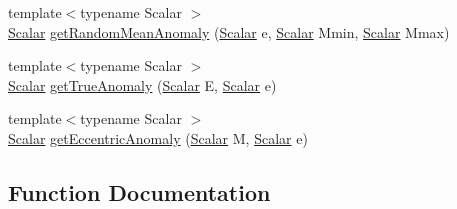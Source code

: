 \begin{DoxyCompactItemize}
\item 
{\footnotesize template$<$typename Scalar $>$ }\\\mbox{\hyperlink{create_kepler_8cpp_a8c2981f3f834be9448a6ab06c28748eb}{Scalar}} \mbox{\hyperlink{namespace_space_h_1_1_orbits_ab0a6bf4bbce5725fa15cc6250057817c}{get\+Random\+Mean\+Anomaly}} (\mbox{\hyperlink{create_kepler_8cpp_a8c2981f3f834be9448a6ab06c28748eb}{Scalar}} e, \mbox{\hyperlink{create_kepler_8cpp_a8c2981f3f834be9448a6ab06c28748eb}{Scalar}} Mmin, \mbox{\hyperlink{create_kepler_8cpp_a8c2981f3f834be9448a6ab06c28748eb}{Scalar}} Mmax)
\item 
{\footnotesize template$<$typename Scalar $>$ }\\\mbox{\hyperlink{create_kepler_8cpp_a8c2981f3f834be9448a6ab06c28748eb}{Scalar}} \mbox{\hyperlink{namespace_space_h_1_1_orbits_a43d1a07ed25eaf775f3a83d7000a2596}{get\+True\+Anomaly}} (\mbox{\hyperlink{create_kepler_8cpp_a8c2981f3f834be9448a6ab06c28748eb}{Scalar}} E, \mbox{\hyperlink{create_kepler_8cpp_a8c2981f3f834be9448a6ab06c28748eb}{Scalar}} e)
\item 
{\footnotesize template$<$typename Scalar $>$ }\\\mbox{\hyperlink{create_kepler_8cpp_a8c2981f3f834be9448a6ab06c28748eb}{Scalar}} \mbox{\hyperlink{namespace_space_h_1_1_orbits_a729783768420346b170d79aa5e196841}{get\+Eccentric\+Anomaly}} (\mbox{\hyperlink{create_kepler_8cpp_a8c2981f3f834be9448a6ab06c28748eb}{Scalar}} M, \mbox{\hyperlink{create_kepler_8cpp_a8c2981f3f834be9448a6ab06c28748eb}{Scalar}} e)
\end{DoxyCompactItemize}


\subsection{Function Documentation}
\mbox{\label{namespace_space_h_1_1_orbits_a67c6c20142cd8a4bd9690741c61314da}} 
